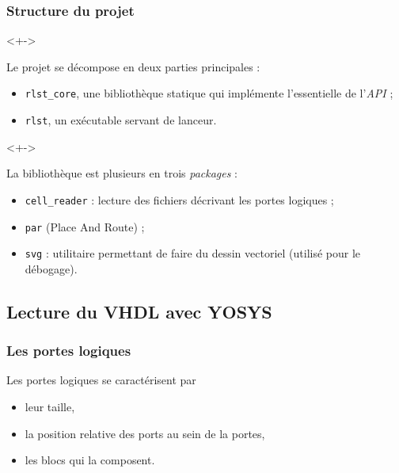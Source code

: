 \documentclass[aspectratio = 1610, french]{beamer}
\begin{document}
\begin{frame}

\frametitle{Structure du projet}

\begin{actionenv}<+->

Le projet se décompose en deux parties principales :

\begin{itemize}
    \item<+-> \texttt{rlst\_core}, une bibliothèque statique qui implémente l'essentielle de l'\emph{API} ;
    \item<+-> \texttt{rlst}, un exécutable servant de lanceur.
\end{itemize}

\end{actionenv}

\begin{actionenv}<+->

La bibliothèque est plusieurs en trois \emph{packages} :

\begin{itemize}
    \item<+-> \texttt{cell\_reader} : lecture des fichiers décrivant les portes logiques ;
    \item<+-> \texttt{par} (\foreignlanguage{english}{Place And Route}) ;
    \item<+-> \texttt{svg} : utilitaire permettant de faire du dessin vectoriel (utilisé pour le débogage).
\end{itemize}

\end{actionenv}

\end{frame}

\subsection{Lecture du VHDL avec YOSYS}

\begin{frame}

\frametitle{Les portes logiques}

Les portes logiques se caractérisent par

\begin{itemize}
    \item<+-> leur taille,
    \item<+-> la position relative des ports au sein de la portes,
    \item<+-> les blocs qui la composent.
\end{itemize}

\end{frame}
\end{document}
